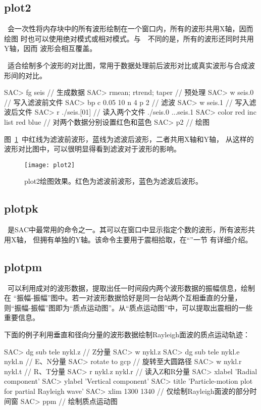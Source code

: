 \subsection{plot2}
~会一次性将内存块中的所有波形绘制在一个窗口内，所有的波形共用X轴，因而绘图
时也可以使用绝对模式或相对模式。与~~不同的是，所有的波形还同时共用Y轴，因而
波形会相互覆盖。

~适合绘制多个波形的对比图，常用于数据处理前后波形对比或真实波形与合成波形间的对比。
\begin{SACCode}
SAC> fg seis                     // 生成数据
SAC> rmean; rtrend; taper        // 预处理
SAC> w seis.0                    // 写入滤波前文件
SAC> bp c 0.05 10 n 4 p 2        // 滤波
SAC> w seis.1                    // 写入滤波后文件
SAC> r ./seis.[01]               // 读入两个文件
./seis.0 ...seis.1
SAC> color red inc list red blue // 对两个数据分别设置红色和蓝色
SAC> p2                          // 绘图
\end{SACCode}
图~\ref{fig:plot2}~中红线为滤波前波形，蓝线为滤波后波形，二者共用X轴和Y轴，
从这样的波形对比图中，可以很明显得看到滤波对于波形的影响。

\begin{figure}[H]
\centering
\texttt{[image: plot2]}
\caption[plot2绘图效果]{plot2绘图效果。红色为滤波前波形，蓝色为滤波后波形。}
\label{fig:plot2}
\end{figure}

\subsection{plotpk}
~是SAC中最常用的命令之一。其可以在窗口中显示指定个数的波形，所有波形共用X轴，
但拥有单独的Y轴。该命令主要用于震相拾取，在``''一节
有详细介绍。

\subsection{plotpm}
~可以利用成对的波形数据，提取出任一时间段内两个波形数据的振幅信息，绘制在
``振幅-振幅''图中。若一对波形数据恰好是同一台站两个互相垂直的分量，
则``振幅-振幅''图即为``质点运动图''。从``质点运动图''中，可以提取出震相的一些重要信息。

下面的例子利用垂直和径向分量的波形数据绘制Rayleigh面波的质点运动轨迹：
\begin{SACCode}
SAC> dg sub tele nykl.z             // Z分量
SAC> w nykl.z
SAC> dg sub tele nykl.e nykl.n      // E、N分量
SAC> rotate to gcp                  // 旋转至大圆路径
SAC> w nykl.r nykl.t                // R、T分量
SAC> r nykl.z nykl.r                // 读入Z和R分量
SAC> xlabel 'Radial component'
SAC> ylabel 'Vertical component'
SAC> title 'Particle-motion plot for partial Rayleigh wave'
SAC> xlim 1300 1340                 // 仅绘制Rayleigh面波的部分时间窗
SAC> ppm                            // 绘制质点运动图
\end{SACCode}

